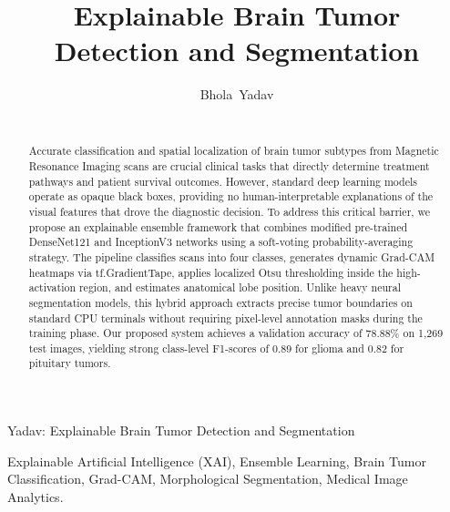 \documentclass[journal,twoside]{IEEEtran}
\begin{document}
\title{Explainable Brain Tumor Detection and Segmentation}

\author{Bhola~Yadav\\ ~\\ 
}

%
{Yadav: Explainable Brain Tumor Detection and Segmentation}

\maketitle

\begin{abstract}
Accurate classification and spatial localization of brain tumor subtypes from Magnetic Resonance Imaging scans are crucial clinical tasks that directly determine treatment pathways and patient survival outcomes. However, standard deep learning models operate as opaque black boxes, providing no human-interpretable explanations of the visual features that drove the diagnostic decision. To address this critical barrier, we propose an explainable ensemble framework that combines modified pre-trained DenseNet121 and InceptionV3 networks using a soft-voting probability-averaging strategy. The pipeline classifies scans into four classes, generates dynamic Grad-CAM heatmaps via tf.GradientTape, applies localized Otsu thresholding inside the high-activation region, and estimates anatomical lobe position. Unlike heavy neural segmentation models, this hybrid approach extracts precise tumor boundaries on standard CPU terminals without requiring pixel-level annotation masks during the training phase. Our proposed system achieves a validation accuracy of 78.88\% on 1,269 test images, yielding strong class-level F1-scores of 0.89 for glioma and 0.82 for pituitary tumors.
\end{abstract}

\begin{IEEEkeywords}
Explainable Artificial Intelligence (XAI), Ensemble Learning, Brain Tumor Classification, Grad-CAM, Morphological Segmentation, Medical Image Analytics.
\end{IEEEkeywords}
\end{document}
